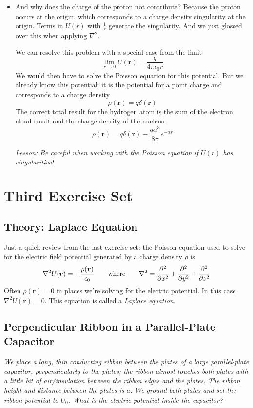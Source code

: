 \documentclass[11pt, a4paper]{article}
\newcommand{\eqtext}[1]{\qquad \text{#1} \qquad}
\renewcommand{\vec}[1]{\bm{#1}} %
\renewcommand{\r}{\vec{r}}
\newcommand{\ee}{\epsilon_{0}}  %
\renewcommand{\laplacian}{\nabla^{2}}
\begin{document}
\begin{itemize}
	\item And why does the charge of the proton not contribute? Because the proton occurs at the origin, which corresponds to a charge density singularity at the origin. Terms in $ U(r) $ with $ \frac{1}{r} $ generate the singularity. And we just glossed over this when applying $ \nabla^{2} $. 
	
	We can resolve this problem with a special case from the limit
	\begin{equation*}
		\lim_{r\to 0}U(\r) = \frac{q}{4\pi \ee r}
	\end{equation*}
	We would then have to solve the Poisson equation for this potential. But we already know this potential: it is the potential for a point charge and corresponds to a charge density
	\begin{equation*}
		\rho(\r) = q \delta(\r)
	\end{equation*}
	The correct total result for the hydrogen atom is the sum of the electron cloud result and the charge density of the nucleus.
	\begin{equation*}
		\rho(\r) = q \delta(\r) - \frac{q\alpha^{3}}{8 \pi}e^{-\alpha r}
	\end{equation*}
	
	\textit{Lesson: Be careful when working with the Poisson equation if $ U(r) $ has singularities!}
	
\end{itemize}

\section{Third Exercise Set}

\subsection{Theory: Laplace Equation}
Just a quick review from the last exercise set: the Poisson equation used to solve for the electric field potential generated by a charge density $ \rho $ is
\begin{equation*}
	\nabla^{2}U(\r) = - \frac{\rho(\r)}{\ee} \eqtext{where} \laplacian = \pdv[2]{}{x} + \pdv[2]{}{y} + \pdv[2]{}{z}
\end{equation*}
Often $ \rho(\r) = 0 $ in places we're solving for the electric potential. In this case $ \laplacian U(\r) = 0 $. This equation is called a \textit{Laplace equation}.

\subsection{Perpendicular Ribbon in a Parallel-Plate Capacitor}
\textit{We place a long, thin conducting ribbon between the plates of a large parallel-plate capacitor, perpendicularly to the plates; the ribbon almost touches both plates with a little bit of air/insulation between the ribbon edges and the plates. The ribbon height and distance between the plates is $ a $. We ground both plates and set the ribbon potential to $ U_{0} $. What is the electric potential inside the capacitor?}
\end{document}
